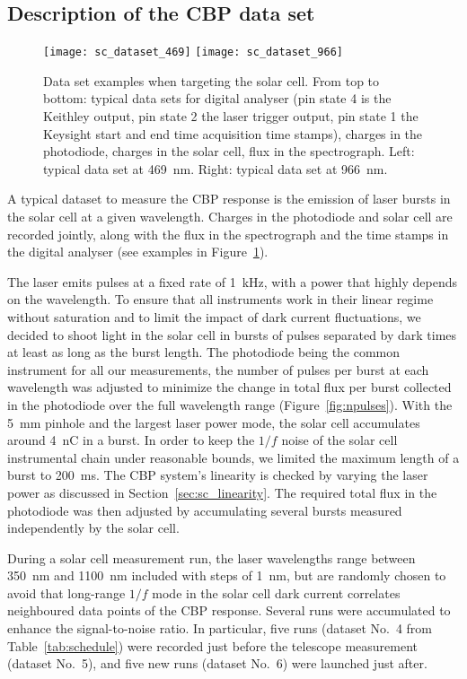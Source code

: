 \subsection{Description of the CBP data set}
\label{sec:cbp_datadesc}

\begin{figure}[!h]
\centering
\texttt{[image: sc\_dataset\_469]}
\texttt{[image: sc\_dataset\_966]}
\caption{Data set examples when targeting the solar cell. From top to bottom: typical data sets for digital analyser (pin state 4 is the Keithley output, pin state 2 the laser trigger output, pin state 1 the Keysight start and end time acquisition time stamps), charges in the photodiode, charges in the solar cell, flux in the spectrograph. Left: typical data set at \SI{469}{\nm}. Right: typical data set at \SI{966}{\nm}.}\label{fig:sc_dataset_examples}
\end{figure}

A typical dataset to measure the CBP response is the emission of laser bursts in the solar cell at a given wavelength. Charges in the photodiode and solar cell are recorded jointly, along with the flux in the spectrograph and the time stamps in the digital analyser (see examples in Figure~\ref{fig:sc_dataset_examples}).

The laser emits pulses at a fixed rate of \SI{1}{\kilo\hertz}, with a power that highly depends on the wavelength. To ensure that all instruments work in their linear regime without saturation and to limit the impact of dark current fluctuations, we decided to shoot light in the solar cell in bursts of pulses separated by dark times at least as long as the burst length. The photodiode being the common instrument for all our measurements, the number of pulses per burst at each wavelength was adjusted to minimize the change in total flux per burst collected in the photodiode over the full wavelength range (Figure~\ref{fig:npulses}). With the \SI{5}{\mm} pinhole and the largest laser power mode, the solar cell accumulates around \SI{4}{\nano\coulomb} in a burst. In order to keep the $1/f$ noise of the solar cell instrumental chain under reasonable bounds, we limited the maximum length of a burst to \SI{200}{\ms}. The CBP system's linearity is checked by varying the laser power as discussed in Section~\ref{sec:sc_linearity}.  The required total flux in the photodiode was then adjusted by accumulating several bursts measured independently by the solar cell.

During a solar cell measurement run, the laser wavelengths range between \SI{350}{\nano\meter} and \SI{1100}{\nano\meter} included with steps of \SI{1}{\nm}, but are randomly chosen to avoid that long-range $ 1/f$ mode in the solar cell dark current correlates neighboured data points of the CBP response. Several runs were accumulated to enhance the signal-to-noise ratio. In particular, five runs (dataset No.~4 from Table~\ref{tab:schedule}) were recorded just before the \SD telescope measurement (dataset No.~5), and five new runs (dataset No.~6) were launched just after.

